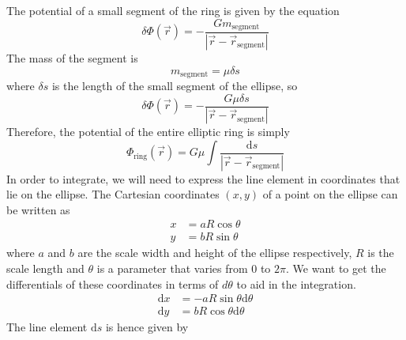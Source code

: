 The potential of a small segment of the ring is given by the equation
\begin{equation}
    \delta \Phi(\vec{r}) = -\frac{Gm_{\text{segment}}}{\left|\vec{r} - \vec{r}_{\text{segment}}\right|}
\end{equation}
The mass of the segment is
\begin{equation}
    m_{\text{segment}} = \mu \delta s
\end{equation}
where \( \delta s \) is the length of the small segment of the ellipse, so
\begin{equation}
    \delta \Phi(\vec{r}) = -\frac{G\mu \delta s}{\left|\vec{r} - \vec{r}_{\text{segment}}\right|}
\end{equation}
Therefore, the potential of the entire elliptic ring is simply
\begin{equation}
    \Phi_{\text{ring}}(\vec{r}) = G\mu \int \frac{\mathrm{d}s}{\left|\vec{r} - \vec{r}_{\text{segment}}\right|}
\end{equation}
In order to integrate, we will need to express the line element in coordinates that lie on the ellipse.
The Cartesian coordinates \( (x, y) \) of a point on the ellipse can be written as
\begin{align}
    x & = aR\cos{\theta} \\
    y & = bR\sin{\theta}
\end{align}
where \( a \) and \( b \) are the scale width and height of the ellipse respectively, \( R \) is the scale length and \( \theta \)
is a parameter that varies from \( 0 \) to \( 2\pi \). We want to get the differentials of these coordinates in terms of
\( d\theta \) to aid in the integration.
\begin{align}
    \mathrm{d}x & = -aR\sin{\theta} \mathrm{d}\theta \\
    \mathrm{d}y & = bR\cos{\theta} \mathrm{d}\theta
\end{align}
The line element \( \mathrm{d}s \) is hence given by
